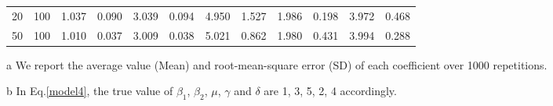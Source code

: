 \documentclass[a4paper]{article}
\begin{document}
\begin{table}[]
\begin{threeparttable}
\begin{tabular}{llllllllllll}
20  & 100 & 1.037                                                        & 0.090 & 3.039                                                        & 0.094 & 4.950                                                    & 1.527 & 1.986                                                       & 0.198 & 3.972                                                       & 0.468 \\
50  & 100 & 1.010                                                        & 0.037 & 3.009                                                        & 0.038 & 5.021                                                    & 0.862 & 1.980                                                       & 0.431 & 3.994                                                       & 0.288 \\ \hline
\end{tabular}

\begin{tablenotes}
        \footnotesize
        \item[a]  We report the average value (Mean) and root-mean-square error (SD) of each coefficient over 1000 repetitions.
        \item[b] In Eq.\eqref{model4}, the true value of $\beta_1$, $\beta_2$, $\mu$, $\gamma$ and $\delta$ are 1, 3, 5, 2, 4 accordingly.
      \end{tablenotes}
\end{threeparttable}

\end{table}
\end{document}
